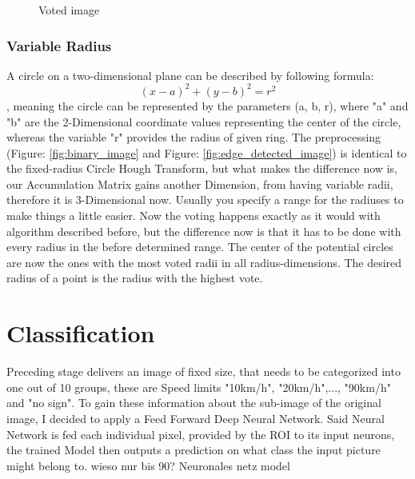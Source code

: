 \begin{figure}[H]
	\caption{Voted image }\label{fig:voted_image}
	\endminipage
\end{figure}

\subsubsection{Variable Radius}
A circle on a two-dimensional plane can be described by following formula: \[ (x - a)^2 + (y - b)^2 = r^2  \]
, meaning the circle can be represented by the parameters (a, b, r), where "a" and "b" are the 2-Dimensional coordinate values representing the center of the circle, whereas the variable "r" provides the radius of given ring. \newline
The preprocessing (Figure: \ref{fig:binary_image} and Figure: \ref{fig:edge_detected_image}) is identical to the fixed-radius Circle Hough Transform, but what makes the difference now is, our Accumulation Matrix gains another Dimension, from having variable radii, therefore it is 3-Dimensional now. Usually you specify a range for the radiuses to make things a little easier. Now the voting happens exactly as it would with algorithm described before, but the difference now is that it has to be done with every radius in the before determined range. The center of the potential circles are now the ones with the most voted radii in all radius-dimensions. The desired radius of a point is the radius with the highest vote.

\section{Classification}
Preceding stage delivers an image of fixed size, that needs to be categorized into one out of 10 groups, these are Speed limits "10km/h", "20km/h",..., "90km/h" and "no sign". To gain these information about the sub-image of the original image, I decided to apply a Feed Forward Deep Neural Network. Said Neural Network is fed each individual pixel, provided by the ROI to its input neurons, the trained Model then outputs a prediction on what class the input picture might belong to. 
\newline
wieso nur bis 90? 
\newline
Neuronales netz model